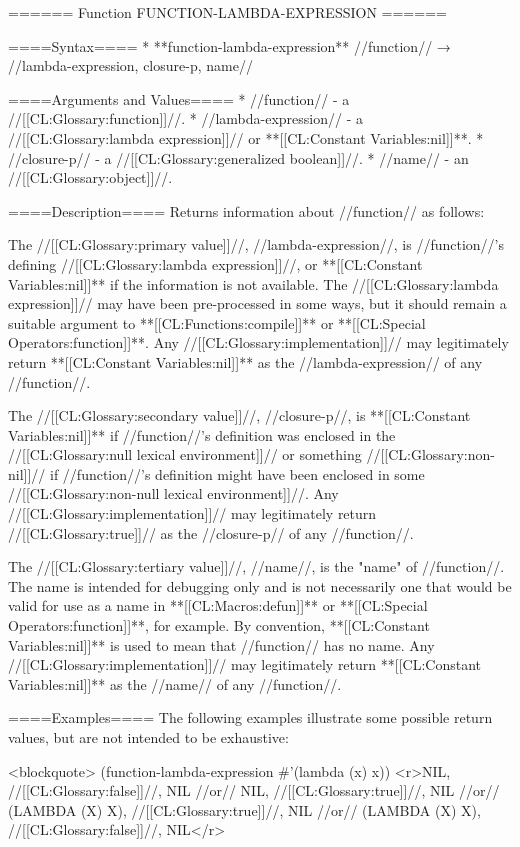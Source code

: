 ====== Function FUNCTION-LAMBDA-EXPRESSION ======

====Syntax====
  * **function-lambda-expression** //function// → //lambda-expression, closure-p, name//

====Arguments and Values====
  * //function// - a //[[CL:Glossary:function]]//.
  * //lambda-expression// - a //[[CL:Glossary:lambda expression]]// or **[[CL:Constant Variables:nil]]**.
  * //closure-p// - a //[[CL:Glossary:generalized boolean]]//.
  * //name// - an //[[CL:Glossary:object]]//.

====Description====
Returns information about //function// as follows:

The //[[CL:Glossary:primary value]]//, //lambda-expression//, is //function//'s defining //[[CL:Glossary:lambda expression]]//, or **[[CL:Constant Variables:nil]]** if the information is not available. The //[[CL:Glossary:lambda expression]]// may have been pre-processed in some ways, but it should remain a suitable argument to **[[CL:Functions:compile]]** or **[[CL:Special Operators:function]]**. Any //[[CL:Glossary:implementation]]// may legitimately return **[[CL:Constant Variables:nil]]** as the //lambda-expression// of any //function//.

The //[[CL:Glossary:secondary value]]//, //closure-p//, is **[[CL:Constant Variables:nil]]** if //function//'s definition was enclosed in the //[[CL:Glossary:null lexical environment]]// or something //[[CL:Glossary:non-nil]]// if //function//'s definition might have been enclosed in some //[[CL:Glossary:non-null lexical environment]]//. Any //[[CL:Glossary:implementation]]// may legitimately return //[[CL:Glossary:true]]// as the //closure-p// of any //function//.

The //[[CL:Glossary:tertiary value]]//, //name//, is the "name" of //function//. The name is intended for debugging only and is not necessarily one that would be valid for use as a name in **[[CL:Macros:defun]]** or **[[CL:Special Operators:function]]**, for example. By convention, **[[CL:Constant Variables:nil]]** is used to mean that //function// has no name. Any //[[CL:Glossary:implementation]]// may legitimately return **[[CL:Constant Variables:nil]]** as the //name// of any //function//.

====Examples====
The following examples illustrate some possible return values, but are not intended to be exhaustive:

<blockquote>
(function-lambda-expression #'(lambda (x) x)) 
<r>NIL, //[[CL:Glossary:false]]//, NIL
//or// NIL, //[[CL:Glossary:true]]//, NIL 
//or// (LAMBDA (X) X), //[[CL:Glossary:true]]//, NIL 
//or// (LAMBDA (X) X), //[[CL:Glossary:false]]//, NIL</r>

